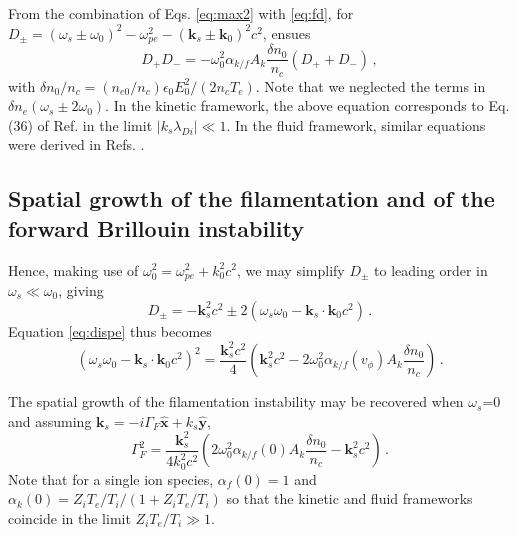 \documentclass[
 reprint,
 superscriptaddress,
 amsmath,amssymb,
 aps,
]{revtex4-1}
\begin{document}
From the combination of  Eqs. \eqref{eq:max2} with \eqref{eq:fd}, 
for $D_\pm= (\omega_s\pm \omega_0)^2 - \omega_{pe}^2 -( \mathbf{k}_s\pm \mathbf{k}_0) ^2c^2 $, ensues
\begin{equation}\label{eq:dispe}
    D_+D_- = -\omega_{0}^2\alpha_{k/f}A_k\frac{\delta n_0}{n_c} (D_++D_-) \, ,
\end{equation}
with $\delta n_0/n_c = (n_{e0}/n_c) \epsilon_0E_0^2/(2n_c T_e)$.
Note that we neglected the terms in $\delta n_e(\omega_s \pm 2\omega_0)$.
In the kinetic framework, the above equation corresponds to Eq. (36) of Ref. \cite[]{POF_Cohen_79} in the limit $\vert k_s \lambda_{Di} \vert \ll 1$. In the fluid framework, similar equations were derived in Refs. \cite[]{Kruer,phd_Michel,phd-Grech}.

\subsection{Spatial growth of the filamentation and of the forward Brillouin instability}
Hence,  making use of $\omega_0^2=\omega_{pe}^2 +k_0^2c^2$, we may simplify $D_\pm$ to leading order in $\omega_s\ll\omega_0$, giving 
\begin{equation}\label{eq:dpm}
D_\pm = -\mathbf{k}_s^2c^2\pm 2(\omega_s\omega_0 - \mathbf{k}_s\cdot\mathbf{k}_0 c^2) \, .
\end{equation} 
Equation \eqref{eq:dispe} thus becomes 
\begin{equation}\label{eq:dispe2} 
(\omega_s\omega_0 - \mathbf{k}_s\cdot\mathbf{k}_0 c^2)^2
=\frac{\mathbf{k}_s^2c^2}{4}\left( \mathbf{k}_s^2c^2 - 2\omega_{0}^2\alpha_{k/f}(v_\phi)A_k\frac{\delta n_0}{n_c} \right) 
\, .
\end{equation}

The spatial growth of the filamentation instability may be recovered when $\omega_s$=0 and assuming $\mathbf{k}_s = -i\Gamma_F\hat{\mathbf{x}} + k_s \hat{\mathbf{y}}$,
\begin{equation}\label{eq:gf} 
\Gamma_F^2
=\frac{\mathbf{k}_s^2}{4k_0^2c^2}\left( 2\omega_{0}^2\alpha_{k/f}(0)A_k\frac{\delta n_0}{n_c}- \mathbf{k}_s^2c^2 \right) 
\, .
\end{equation}
Note that for a single ion species,  $\alpha_f(0)=1$ and $\alpha_k(0)= Z_iT_e/T_i/(1+Z_iT_e/T_i)$ so that the kinetic and fluid frameworks coincide in the limit $Z_iT_e/T_i\gg 1$.
\end{document}
